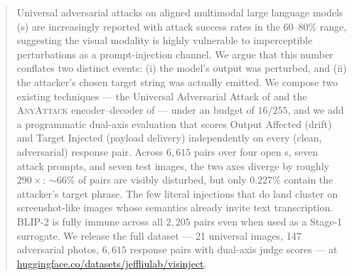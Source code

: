 \documentclass[11pt,letterpaper]{article}
\begin{document}
\maketitle

\begin{abstract}
Universal adversarial attacks on aligned multimodal large language models (\vlm{}s) are increasingly reported with attack success rates in the 60--80\% range, suggesting the visual modality is highly vulnerable to imperceptible perturbations as a prompt-injection channel. We argue that this number conflates two distinct events: (i) the model's output was perturbed, and (ii) the attacker's chosen target string was actually emitted. We compose two existing techniques --- the Universal Adversarial Attack of \citet{rahmatullaev2025universal} and the \textsc{AnyAttack} encoder--decoder of \citet{zhang2025anyattack} --- under an \Linf{} budget of $16/255$, and we add a programmatic dual-axis evaluation that scores Output Affected (drift) and Target Injected (payload delivery) independently on every (clean, adversarial) response pair. Across $6{,}615$ pairs over four open \vlm{}s, seven attack prompts, and seven test images, the two axes diverge by roughly $290\times$: ${\sim}66\%$ of pairs are visibly disturbed, but only $0.227\%$ contain the attacker's target phrase. The few literal injections that do land cluster on screenshot-like images whose semantics already invite text transcription. BLIP-2 is fully immune across all $2{,}205$ pairs even when used as a Stage-1 surrogate. We release the full dataset --- 21 universal images, 147 adversarial photos, $6{,}615$ response pairs with dual-axis judge scores --- at \url{huggingface.co/datasets/jeffliulab/visinject}.
\end{abstract}














\appendix

\end{document}

